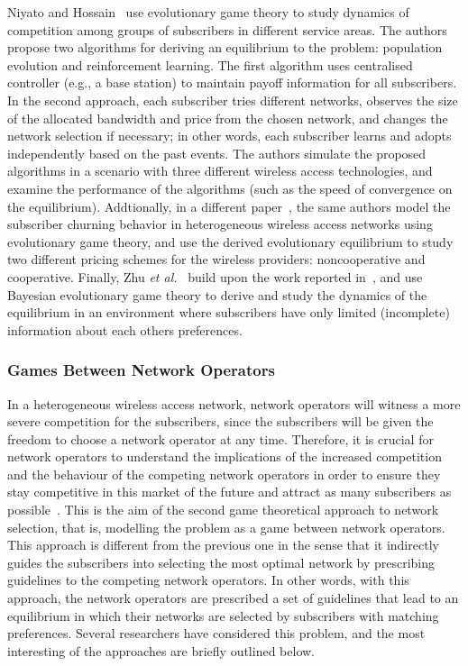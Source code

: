 Niyato and Hossain~\cite{Niyato09} use evolutionary game theory to study dynamics of competition among groups of subscribers in different service areas. The authors propose two algorithms for deriving an equilibrium to the problem: population evolution and reinforcement learning. The first algorithm uses centralised controller (e.g., a base station) to maintain payoff information for all subscribers. In the second approach, each subscriber tries different networks, observes the size of the allocated bandwidth and price from the chosen network, and changes the network selection if necessary; in other words, each subscriber learns and adopts independently based on the past events. The authors simulate the proposed algorithms in a scenario with three different wireless access technologies, and examine the performance of the algorithms (such as the speed of convergence on the equilibrium). Addtionally, in a different paper~\cite{NiyatoHossainConf2008}, the same authors model the subscriber churning behavior in heterogeneous wireless access networks using evolutionary game theory, and use the derived evolutionary equilibrium to study two different pricing schemes for the wireless providers: noncooperative and cooperative. Finally, Zhu \emph{et al.}~\cite{ZhuNiyato2010} build upon the work reported in~\cite{Niyato09}, and use Bayesian evolutionary game theory to derive and study the dynamics of the equilibrium in an environment where subscribers have only limited (incomplete) information about each others preferences.

\subsubsection{Games Between Network Operators} %
\label{ssub:games_between_network_operators}
In a heterogeneous wireless access network, network operators will witness a more severe competition for the subscribers, since the subscribers will be given the freedom to choose a network operator at any time. Therefore, it is crucial for network operators to understand the implications of the increased competition and the behaviour of the competing network operators in order to ensure they stay competitive in this market of the future and attract as many subscribers as possible~\cite{LushengKuo2013}. This is the aim of the second game theoretical approach to network selection, that is, modelling the problem as a game between network operators. This approach is different from the previous one in the sense that it indirectly guides the subscribers into selecting the most optimal network by prescribing guidelines to the competing network operators. In other words, with this approach, the network operators are prescribed a set of guidelines that lead to an equilibrium in which their networks are selected by subscribers with matching preferences. Several researchers have considered this problem, and the most interesting of the approaches are briefly outlined below.

